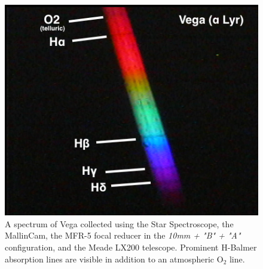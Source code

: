\documentclass[12pt,titlepage]{article}
\begin{document}
\begin{figure}[H] 
	\begin{center}
		\includegraphics[width=.6\textwidth]{./images/rbw_optics/vega_spec_labeled.png} 
		\caption{A spectrum of Vega collected using the Star Spectroscope, the MallinCam,
				 the MFR-5 focal reducer in the \textit{10mm + "B" + "A"} configuration,
				 and the Meade LX200 telescope. Prominent H-Balmer absorption lines are
				 visible in addition to an atmospheric O$_2$ line.}
		\label{mfr5}
	\end{center}
\end{figure}
\end{document}
